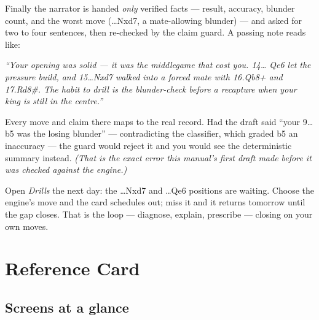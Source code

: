 \documentclass[11pt]{article}
\newcommand{\code}[1]{{\ttfamily #1}}
\begin{document}
\begin{playbox}
Finally the narrator is handed \emph{only} verified facts --- result, accuracy,
blunder count, and the worst move (\code{15\dots Nxd7}, a mate-allowing blunder)
--- and asked for two to four sentences, then re-checked by the claim guard. A
passing note reads like:

\vspace{2pt}
\emph{``Your opening was solid --- it was the middlegame that cost you. 14\dots
Qe6 let the pressure build, and 15\dots Nxd7 walked into a forced mate with
16.Qb8+ and 17.Rd8\#. The habit to drill is the blunder-check before a
recapture when your king is still in the centre.''}

\vspace{4pt}
Every move and claim there maps to the real record. Had the draft said ``your
9\dots b5 was the losing blunder'' --- contradicting the classifier, which
graded b5 an inaccuracy --- the guard would reject it and you would see the
deterministic summary instead. \emph{(That is the exact error this manual's first
draft made before it was checked against the engine.)}
\end{playbox}

\begin{notebox}
Open \emph{Drills} the next day: the \code{15\dots Nxd7} and \code{14\dots Qe6}
positions are waiting. Choose the engine's move and the card schedules out; miss
it and it returns tomorrow until the gap closes. That is the loop --- diagnose,
explain, prescribe --- closing on your own moves.
\end{notebox}

\section{Reference Card}

\subsection{Screens at a glance}
\end{document}

